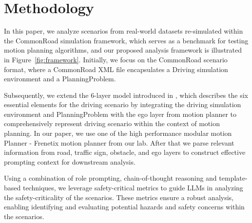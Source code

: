 
\section{Methodology}
\label{sec:method}
In this paper, we analyze scenarios from real-world datasets re-simulated  within the CommonRoad simulation framework, which serves as a benchmark for testing motion planning algorithms, and our proposed analysis framework is illustrated in Figure~\ref{fig:framework}. Initially, we focus on the CommonRoad scenario format, where a CommonRoad XML file encapsulates a Driving simulation environment and a PlanningProblem.

Subsequently, we extend the 6-layer model introduced in \cite{scholtes20216}, which describes the six essential elements for the driving scenario by integrating the driving simulation environment and PlanningProblem with the ego layer from motion planner to comprehensively represent driving scenario within the context of motion planning. In our paper, we use one of the high performance modular motion Planner - Frenetix motion planner \cite{Frenetix} from our lab. After that we parse relevant information from road, traffic sign, obstacle, and ego layers to construct effective prompting context for downstream analysis.

Using a combination of role prompting, chain-of-thought reasoning and template-based techniques, we leverage safety-critical metrics to guide LLMs in analyzing the safety-criticality of the scenarios. These metrics ensure a robust analysis, enabling identifying and evaluating potential hazards and safety concerns within the scenarios.


